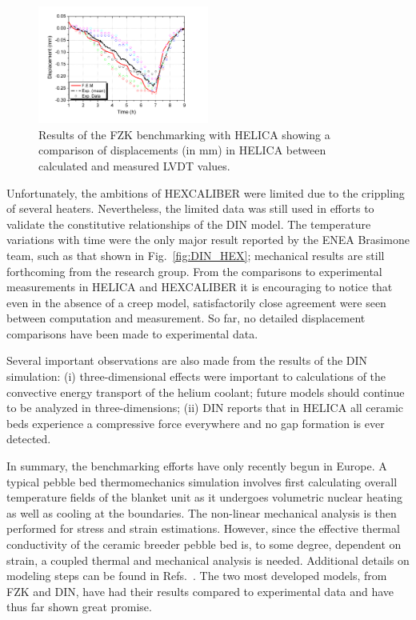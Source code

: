 \begin{figure}[t!]
\centering
\includegraphics[width=0.5\textwidth]{chapters/figures/Fig-7}
\caption{Results of the FZK benchmarking with HELICA\cite{Gan:2009vn} showing a comparison of displacements (in mm) in HELICA between calculated and measured LVDT values.}
\label{fig:FZK_HELICAb}
\end{figure}

Unfortunately, the ambitions of HEXCALIBER were limited due to the crippling of several heaters. Nevertheless, the limited data was still used in efforts to validate the constitutive relationships of the DIN model. The temperature variations with time were the only major result reported by the ENEA Brasimone team, such as that shown in Fig.~\ref{fig:DIN_HEX}; mechanical results are still forthcoming from the research group. From the comparisons to experimental measurements in HELICA and HEXCALIBER it is encouraging to notice that even in the absence of a creep model, satisfactorily close agreement were seen between computation and measurement. So far, no detailed displacement comparisons have been made to experimental data.

Several important observations are also made from the results of the DIN simulation: (i) three-dimensional effects were important to calculations of the convective energy transport of the helium coolant; future models should continue to be analyzed in three-dimensions; (ii) DIN reports that in HELICA all ceramic beds experience a compressive force everywhere and no gap formation is ever detected. 

In summary, the benchmarking efforts have only recently begun in Europe. A typical pebble bed thermomechanics simulation involves first calculating overall temperature fields of the blanket unit as it undergoes volumetric nuclear heating as well as cooling at the boundaries. The non-linear mechanical analysis is then performed for stress and strain estimations. However, since the effective thermal conductivity of the ceramic breeder pebble bed is, to some degree, dependent on strain, a coupled thermal and mechanical analysis is needed. Additional details on modeling steps can be found in Refs.~\cite{DellOrco:2010zr,DiMaio20081287,DiMaio20101234,Gan:2009vn,Gan:2010lh,dellorco:2006}. The two most developed models, from FZK and DIN, have had their results compared to experimental data and have thus far shown great promise. 

